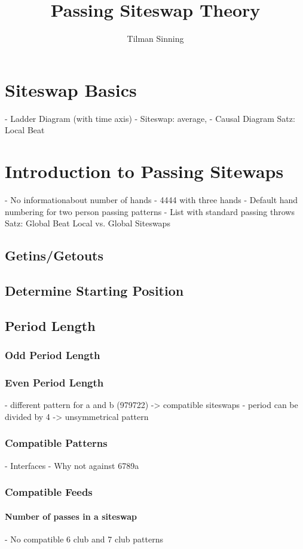 \documentclass[a4paper,12pt,parskip=full]{scrreprt}
\title{Passing Siteswap Theory}
\author{Tilman Sinning}
\begin{document}
	\maketitle
	
	\tableofcontents

%	
	
	\chapter{Siteswap Basics}
	- Ladder Diagram (with time axis)
	- Siteswap: average, 
	- Causal Diagram
	Satz: Local Beat
	\chapter{Introduction to Passing Sitewaps}
	- No informationabout number of hands
	- 4444 with three hands
	- Default hand numbering for two person passing patterns
	- List with standard passing throws
	Satz: Global Beat
	Local vs. Global Siteswaps
	\section{Getins/Getouts}
	\section{Determine Starting Position}
	\section{Period Length}
	\subsection{Odd Period Length}
	\subsection{Even Period Length}
	 - different pattern for a and b (979722) -> compatible siteswaps
	 - period can be divided by 4 -> unsymmetrical pattern
	\subsection{Compatible Patterns}
	 - Interfaces
	 - Why not against 6789a
	\subsection{Compatible Feeds}
	\subsubsection{Number of passes in a siteswap}
	- No compatible 6 club and 7 club patterns
\end{document}
